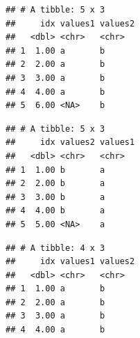 \documentclass[krantz2,ChapterTOCs]{krantz}\usepackage{knitr}
\begin{document}
\begin{knitrout}\footnotesize
{}\color{fgcolor}\begin{kframe}
\begin{alltt}
\end{alltt}


{\ttfamily\noindent\itshape{}}\begin{verbatim}
## # A tibble: 5 x 3
##     idx values1 values2
##   <dbl> <chr>   <chr>  
## 1  1.00 a       b      
## 2  2.00 a       b      
## 3  3.00 a       b      
## 4  4.00 a       b      
## 5  6.00 <NA>    b
\end{verbatim}
\end{kframe}
\end{knitrout}

\begin{knitrout}\footnotesize
{}\color{fgcolor}\begin{kframe}
\begin{alltt}
\end{alltt}


{\ttfamily\noindent\itshape{}}\begin{verbatim}
## # A tibble: 5 x 3
##     idx values2 values1
##   <dbl> <chr>   <chr>  
## 1  1.00 b       a      
## 2  2.00 b       a      
## 3  3.00 b       a      
## 4  4.00 b       a      
## 5  5.00 <NA>    a
\end{verbatim}
\end{kframe}
\end{knitrout}

\begin{knitrout}\footnotesize
{}\color{fgcolor}\begin{kframe}
\begin{alltt}
\end{alltt}


{\ttfamily\noindent\itshape{}}\begin{verbatim}
## # A tibble: 4 x 3
##     idx values1 values2
##   <dbl> <chr>   <chr>  
## 1  1.00 a       b      
## 2  2.00 a       b      
## 3  3.00 a       b      
## 4  4.00 a       b
\end{verbatim}
\end{kframe}
\end{knitrout}
\end{document}
